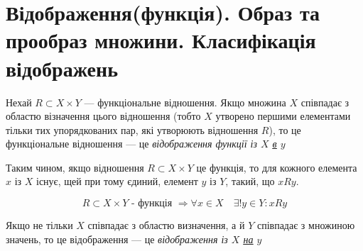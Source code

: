 \begin{center}
\end{center}

\section{Відображення(функція). Образ та прообраз множини. Класифікація відображень}

Нехай $R \subset X \times Y$ --- функціональне відношення. Якщо множина $X$
співпадає з областю візначення цього відношення (тобто $X$ утворено першими
елементами тільки тих упорядкованих пар, які утворюють відношення $R$), то це
функціональне відношення --- це \textit{відображення функції із $X$ \underline{\underline{в}} $y$}

Таким чином, якщо відношення $R \subset X \times Y$ це функція, то для кожного
елемента $x$ із $X$ існує, щей при тому єдиний, елемент $y$ із $Y$, такий, що
$xRy$.

\begin{equation*}
    R \subset X \times Y \text{ - функція } \Rightarrow \forall x \in X \quad \exists! y \in Y: xRy
\end{equation*}

Якщо не тільки $X$ співпадає з областю визначення, а й $Y$ співпадає з множиною
значень, то це відображення --- це \textit{відображення із $X$
\underline{\underline{на}} $y$}

